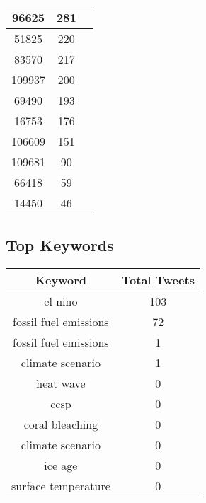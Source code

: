 \documentclass{article}\usepackage[T1]{fontenc}
\begin{document}
\begin{tabular}{|c|c|c|}
 \hline
96625 & 281\\ 
 \hline
51825 & 220\\ 
 \hline
83570 & 217\\ 
 \hline
109937 & 200\\ 
 \hline
69490 & 193\\ 
 \hline
16753 & 176\\ 
 \hline
106609 & 151\\ 
 \hline
109681 & 90\\ 
 \hline
66418 & 59\\ 
 \hline
14450 & 46\\ 
 \hline
\end{tabular}\subsection*{Top Keywords}\begin{tabular}{|c|c|}         \hline         Keyword & Total Tweets \\ 
 \hline
el nino & 103\\ 
 \hline
fossil fuel emissions & 72\\ 
 \hline
fossil fuel emissions & 1\\ 
 \hline
climate scenario & 1\\ 
 \hline
heat wave & 0\\ 
 \hline
ccsp & 0\\ 
 \hline
coral bleaching & 0\\ 
 \hline
climate scenario & 0\\ 
 \hline
ice age & 0\\ 
 \hline
surface temperature & 0\\ 
 \hline
\end{tabular}
\end{document}
